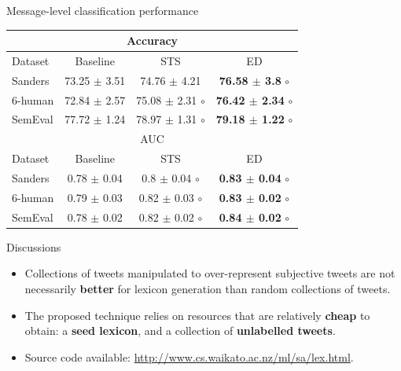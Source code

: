 \documentclass[handout]{beamer}
\begin{document}
\begin{frame}{Message-level classification performance}
\begin{scriptsize}
 \begin{table}[htbp]
\scriptsize
\begin{center}
\begin{tabular}{l|c|c|c}
\hline \hline
\multicolumn{ 4}{c}{Accuracy } \\ \hline \hline
Dataset & Baseline & STS & ED \\ \hline
Sanders & 73.25 $\pm$ 3.51 & 74.76 $\pm$ 4.21 & \textbf{76.58 $\pm$ 3.8} $\circ$ \\ 
6-human & 72.84 $\pm$ 2.57 & 75.08 $\pm$ 2.31 $\circ$ & \textbf{76.42 $\pm$ 2.34} $\circ$ \\ 
SemEval & 77.72 $\pm$ 1.24 & 78.97 $\pm$ 1.31 $\circ$ & \textbf{79.18 $\pm$ 1.22} $\circ$ \\ \hline \hline
\multicolumn{ 4}{c}{AUC} \\ \hline \hline
Dataset & Baseline & STS & ED \\ \hline
Sanders & 0.78 $\pm$ 0.04 & 0.8 $\pm$ 0.04 $\circ$ & \textbf{0.83 $\pm$ 0.04} $\circ$ \\ 
6-human & 0.79 $\pm$ 0.03 & 0.82 $\pm$ 0.03 $\circ$ & \textbf{0.83 $\pm$ 0.02} $\circ$ \\ 
SemEval & 0.78 $\pm$ 0.02 & 0.82 $\pm$ 0.02 $\circ$ & \textbf{0.84 $\pm$ 0.02} $\circ$ \\ \hline
\end{tabular}
\end{center}
\end{table}
\end{scriptsize}
\end{frame}







\begin{frame}{Discussions}
\begin{scriptsize}
\begin{itemize}
\item  Collections of tweets manipulated to over-represent subjective tweets are not necessarily \textbf{better} for lexicon generation than random collections of tweets.
\item The proposed technique relies on resources that are relatively \textbf{cheap} to obtain: a \textbf{seed lexicon}, and a collection of \textbf{unlabelled tweets}.
\item Source code available: \url{http://www.cs.waikato.ac.nz/ml/sa/lex.html}.
\end{itemize}
\end{scriptsize}
\end{frame}
\end{document}
